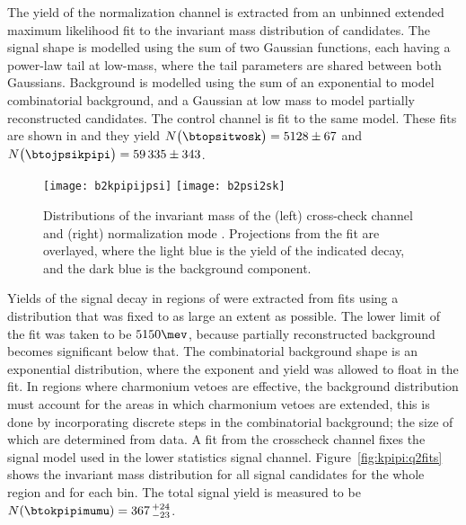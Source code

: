 The yield  of the normalization channel is extracted from an unbinned extended maximum likelihood
fit to the invariant mass distribution of \btopsitwosk candidates.
The signal shape is modelled using the sum of two Gaussian functions, each having a power-law
tail at low-mass, where the tail parameters are shared between both Gaussians.
Background is modelled using the sum of an exponential to model combinatorial background, and a
Gaussian at low mass to model partially reconstructed candidates.
The control channel \btojpsikpipi is fit to the same model.
These fits are shown in  and they yield
$N\big(\btopsitwosk\big)=5128\pm67$ and $N\big(\btojpsikpipi\big)=59\,335\pm343$.

\begin{figure}
  \begin{center}
    \texttt{[image: b2kpipijpsi]}
    \texttt{[image: b2psi2sk]}
    \caption[Fits to \btojpsikpipi and \btopsitwosk candidates]
    {\small
      Distributions of the invariant mass of the
      (left) cross-check channel \btojpsikpipi and
      (right) normalization mode \btopsitwosk.
      Projections from the fit are overlayed, where the light blue is the yield of the indicated
      decay, and the dark blue is the background component.
    }
    \label{fig:kpipi:norm}
  \end{center}
\end{figure}



Yields of the signal decay in regions of \qsq were extracted from fits using a distribution that
was fixed to as large an extent as possible.
The lower limit of the fit was taken to be $5150\mev$, because partially reconstructed background
becomes significant below that.
The combinatorial background shape is an exponential distribution, where the exponent and yield was
allowed to float in the fit.
In \qsq regions where charmonium vetoes are effective, the background distribution must account for
the areas in which charmonium vetoes are extended, this is done by incorporating discrete steps in
the combinatorial background; the size of which are determined from data.
A fit from the crosscheck channel fixes the signal model used in the lower statistics signal
channel.
Figure~\ref{fig:kpipi:q2fits} shows the invariant mass distribution for all signal
candidates for the whole \qsq region and for each bin.
The total signal yield is measured to be $N(\btokpipimumu)=367\,^{+24}_{-23}$.


